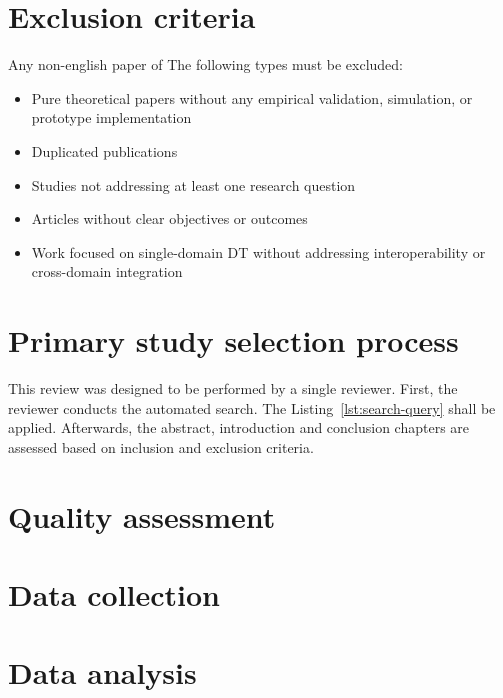 \section{Exclusion criteria}

Any non-english paper of The following types must be excluded:

\begin{itemize}
    \item Pure theoretical papers without any empirical validation, simulation, or prototype implementation
    \item Duplicated publications
    \item Studies not addressing at least one research question
    \item Articles without clear objectives or outcomes
    \item Work focused on single-domain DT without addressing interoperability or cross-domain integration
\end{itemize}

\section{Primary study selection process}

This review was designed to be performed by a single reviewer.
First, the reviewer conducts the automated search. The Listing~\ref{lst:search-query} shall be applied.
Afterwards, the abstract, introduction and conclusion chapters are assessed
    based on inclusion and exclusion criteria.  

\section{Quality assessment}

\section{Data collection}

\section{Data analysis}


